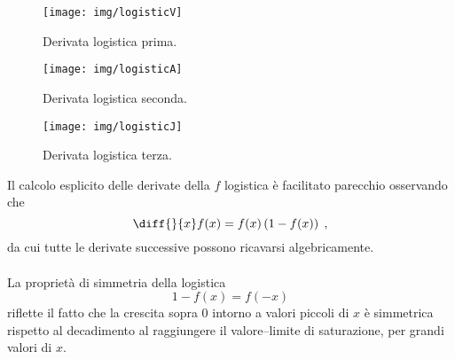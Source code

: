 \begin{figure}[pbh]
    \centering
    \texttt{[image: img/logisticV]}

    \caption{Derivata logistica prima.}
    \label{img:logisticV}
\end{figure}
\begin{figure}[pbh]
    \centering
    \texttt{[image: img/logisticA]}

    \caption{Derivata logistica seconda.}
    \label{img:logisticA}
\end{figure}
\begin{figure}[pbh]
    \centering
    \texttt{[image: img/logisticJ]}

    \caption{Derivata logistica terza.}
    \label{img:logisticJ}
\end{figure}

Il calcolo esplicito delle derivate della $f$ logistica è facilitato parecchio osservando che
$$\diff{}{x} f(x) = f(x) \left( {1-f(x)} \right) \; ,$$
da cui tutte le derivate successive possono ricavarsi algebricamente.

\paragraph{}
La proprietà di simmetria della logistica
$$1 -f(x) = f(-x)$$
riflette il fatto che la crescita sopra $0$ intorno a valori piccoli di $x$ è
simmetrica rispetto al decadimento al raggiungere il valore--limite di saturazione,
per grandi valori di $x$.


